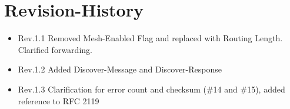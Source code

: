 \documentclass{scrreprt}
\begin{document}
\pagebreak
\chapter{Revision-History}
\begin{itemize}
  \item Rev.1.1 Removed Mesh-Enabled Flag and replaced with Routing Length. Clarified forwarding.
  \item Rev.1.2 Added Discover-Message and Discover-Response
  \item Rev.1.3 Clarification for error count and checksum (\#14 and \#15), added reference to RFC 2119
\end{itemize}
\end{document}
